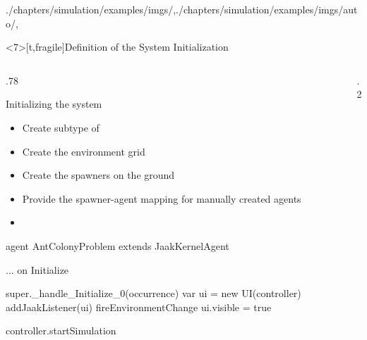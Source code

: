 \begin{graphicspathcontext}{{./chapters/simulation/examples/imgs/},{./chapters/simulation/examples/imgs/auto/},\old}
\begin{frame}<7>[t,fragile]{Definition of the System Initialization \insertcontinuationtext}
	\vspace{-.5cm}
	\smaller
	\begin{columns}
		\begin{column}[t]{.78\linewidth}
			{\smaller
			\begin{block}{Initializing the system}
				\begin{itemize}
				\item Create subtype of 
				\item Create the environment grid
				\item Create the spawners on the ground
				\item Provide the spawner-agent mapping for manually created agents
				\item {}
				\end{itemize}
			\end{block}}
			\begin{sarllisting}[basicstyle=\scriptsize]
agent AntColonyProblem extends JaakKernelAgent {
...
  on Initialize {
    super._handle_Initialize_0(occurrence)
    var ui = new UI(controller)
    addJaakListener(ui)
    fireEnvironmentChange
    ui.visible = true

    controller.startSimulation
  }
}
			\end{sarllisting}
		\end{column}
		\begin{column}[t]{.2\linewidth}
		\end{column}
	\end{columns}
\end{frame}

\end{graphicspathcontext}
